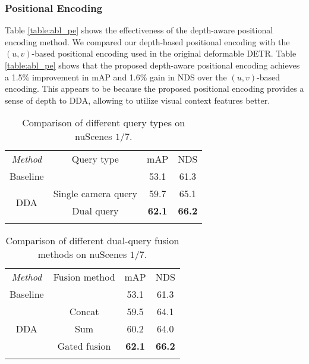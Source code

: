 \documentclass[lettersize,journal]{IEEEtran}
\begin{document}
\subsubsection{Positional Encoding}
Table \ref{table:abl_pe} shows the effectiveness of the depth-aware positional encoding method. We compared our depth-based positional encoding with the $(u,v)$-based positional encoding used in the original deformable DETR. Table \ref{table:abl_pe} shows that the proposed depth-aware positional encoding achieves a 1.5\% improvement in mAP and 1.6\% gain in NDS over the $(u,v)$-based encoding. This appears to be because the proposed positional encoding provides a sense of depth to DDA, allowing to  utilize visual context features better.



\begin{table}[t]
\centering
\caption{Comparison of different query types on nuScenes $1/7$.}
\begin{tabular}{cccc}
\cline{1-4}
\textit{Method}    & Query type      & mAP  & NDS  \\
\cline{1-4}
Baseline\cite{centerpoint}& & 53.1 & 61.3 \\
\cline{1-4}
\multirow{2}{*}{DDA}  
         & Single camera query    & 59.7 & 65.1 \\
& Dual query     & \textbf{62.1} & \textbf{66.2}\\

\cline{1-4}
\label{table:abl_query_type}
\end{tabular}
\end{table} 
\begin{table}[t]
\centering
\caption{Comparison of different dual-query fusion methods on nuScenes $1/7$. }
\begin{tabular}{cccc}
\cline{1-4}
\textit{Method}    & Fusion method      & mAP  & NDS  \\
\cline{1-4}
Baseline\cite{centerpoint}& & 53.1 & 61.3 \\
\cline{1-4}
\multirow{3}{*}{DDA}  
         & Concat    & 59.5 & 64.1 \\
        &Sum        & 60.2 & 64.0 \\
                &Gated fusion     & \textbf{62.1} & \textbf{66.2}\\

\cline{1-4}
\label{table:abl_dda_fm}
\end{tabular}
\end{table}
\end{document}
